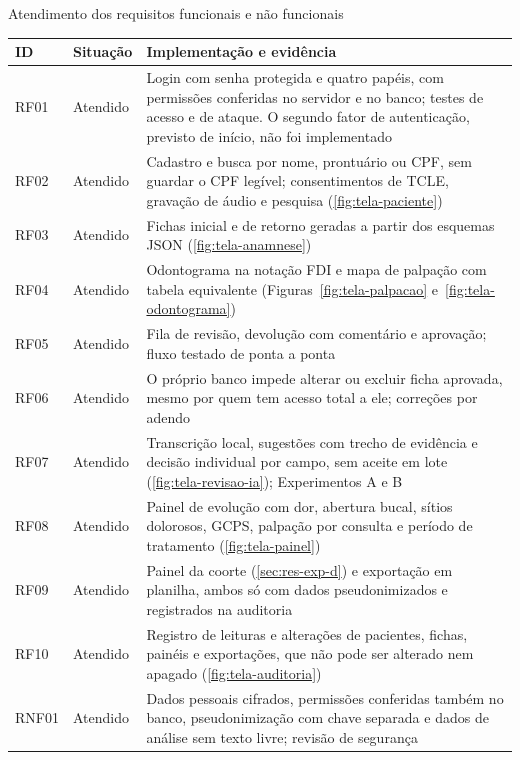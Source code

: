 \begin{quadro}[htbp]
	\caption{Atendimento dos requisitos funcionais e não funcionais}
	\label{qua:atendimento-requisitos}
	\footnotesize
	\begin{tabularx}{\textwidth}{|L{1.2cm}|L{1.6cm}|Y|}
		\hline
		\textbf{ID} & \textbf{Situação} & \textbf{Implementação e evidência} \\ \hline
		RF01 & Atendido & Login com senha protegida e quatro papéis, com permissões conferidas no servidor e no banco; testes de acesso e de ataque. O segundo fator de autenticação, previsto de início, não foi implementado \\ \hline
		RF02 & Atendido & Cadastro e busca por nome, prontuário ou CPF, sem guardar o CPF legível; consentimentos de TCLE, gravação de áudio e pesquisa (\autoref{fig:tela-paciente}) \\ \hline
		RF03 & Atendido & Fichas inicial e de retorno geradas a partir dos esquemas JSON (\autoref{fig:tela-anamnese}) \\ \hline
		RF04 & Atendido & Odontograma na notação FDI e mapa de palpação com tabela equivalente (Figuras~\ref{fig:tela-palpacao} e~\ref{fig:tela-odontograma}) \\ \hline
		RF05 & Atendido & Fila de revisão, devolução com comentário e aprovação; fluxo testado de ponta a ponta \\ \hline
		RF06 & Atendido & O próprio banco impede alterar ou excluir ficha aprovada, mesmo por quem tem acesso total a ele; correções por adendo \\ \hline
		RF07 & Atendido & Transcrição local, sugestões com trecho de evidência e decisão individual por campo, sem aceite em lote (\autoref{fig:tela-revisao-ia}); Experimentos A e B \\ \hline
		RF08 & Atendido & Painel de evolução com dor, abertura bucal, sítios dolorosos, GCPS, palpação por consulta e período de tratamento (\autoref{fig:tela-painel}) \\ \hline
		RF09 & Atendido & Painel da coorte (\autoref{sec:res-exp-d}) e exportação em planilha, ambos só com dados pseudonimizados e registrados na auditoria \\ \hline
		RF10 & Atendido & Registro de leituras e alterações de pacientes, fichas, painéis e exportações, que não pode ser alterado nem apagado (\autoref{fig:tela-auditoria}) \\ \hline
		RNF01 & Atendido & Dados pessoais cifrados, permissões conferidas também no banco, pseudonimização com chave separada e dados de análise sem texto livre; revisão de segurança \\ \hline

\end{tabularx}
\end{quadro}
